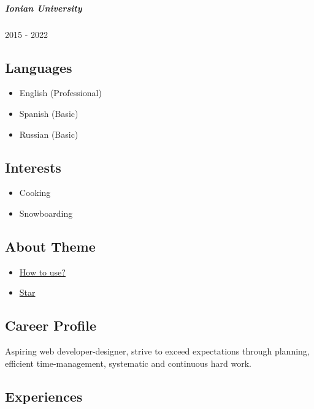 \documentclass[
]{article}
\providecommand{\tightlist}{%
  \setlength{\itemsep}{0pt}\setlength{\parskip}{0pt}}
\begin{document}
\hypertarget{ionian-university}{%
\subparagraph{Ionian University}\label{ionian-university}}

2015 - 2022

\hypertarget{languages}{%
\subsection{Languages}\label{languages}}

\begin{itemize}
\tightlist
\item
  English {(Professional)}
\item
  Spanish {(Basic)}
\item
  Russian {(Basic)}
\end{itemize}

\hypertarget{interests}{%
\subsection{Interests}\label{interests}}

\begin{itemize}
\tightlist
\item
  Cooking
\item
  Snowboarding
\end{itemize}

\hypertarget{about-theme}{%
\subsection{About Theme}\label{about-theme}}

\begin{itemize}
\tightlist
\item
  \href{https://www.youtube.com/watch?v=Jnmj1dXDbNk}{How to use?}
\item
  \href{https://github.com/sharu725/online-cv}{Star}
\end{itemize}

\hypertarget{career-profile}{%
\subsection{\texorpdfstring{{ \emph{} \emph{} } Career
Profile}{    Career Profile}}\label{career-profile}}

Aspiring web developer-designer, strive to exceed expectations through
planning, efficient time-management, systematic and continuous hard
work.

\hypertarget{experiences}{%
\subsection{\texorpdfstring{{ \emph{} \emph{} }
Experiences}{    Experiences}}\label{experiences}}
\end{document}
